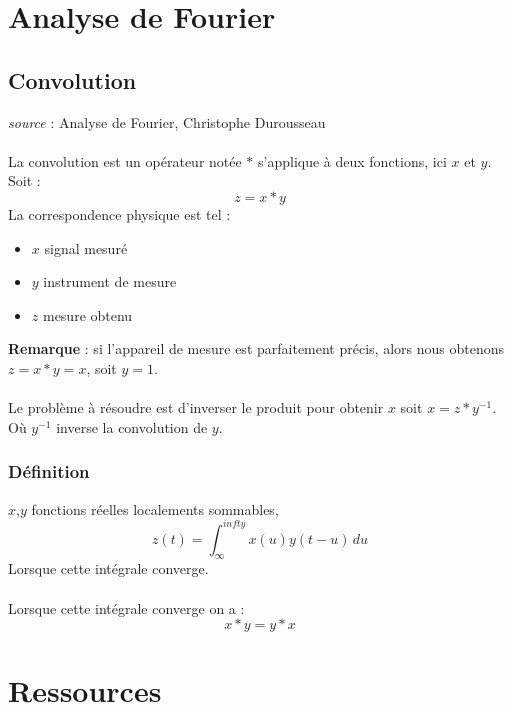 \documentclass[a4paper]{book}
\begin{document}
\part{Analyse de Fourier}
\chapter{Convolution}
\emph{source} : Analyse de Fourier, Christophe Durousseau\\
\\
La convolution est un opérateur notée $*$ s'applique à deux fonctions, ici $x$
et $y$. Soit :
\begin{equation}
	z = x * y
\end{equation}
La correspondence physique est tel :
\begin{itemize}
	\item $x$ signal mesuré
	\item $y$ instrument de mesure
	\item $z$ mesure obtenu
\end{itemize}
\textbf{Remarque} : si l'appareil de mesure est parfaitement précis, alors nous
obtenons $z = x * y = x$, soit $y = 1$.\\
\\
Le problème à résoudre est d'inverser le produit pour obtenir $x$ soit $x = z *
y^{-1}$. Où $y^{-1}$ inverse la convolution de $y$.

\section{Définition}
$x$,$y$ fonctions réelles localements sommables,
\begin{equation}
	z(t) = \int_{\infty}^{infty} x(u) y(t-u) \, du
\end{equation}
Lorsque cette intégrale converge.\\
\\
Lorsque cette intégrale converge on a :
\begin{equation}
	x * y = y * x
\end{equation}




\part{Ressources}
\end{document}
